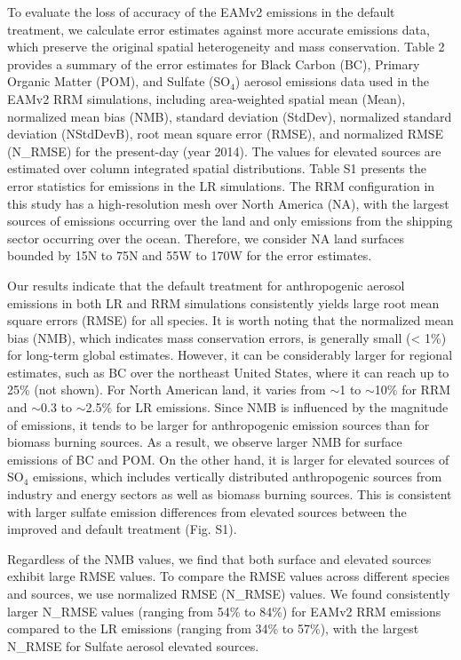 To evaluate the loss of accuracy of the EAMv2 emissions in the default treatment, we calculate error estimates against more accurate emissions data, which preserve the original spatial heterogeneity and mass conservation. Table 2 provides a summary of the error estimates for Black Carbon (BC), Primary Organic Matter (POM), and Sulfate (SO$_4$) aerosol emissions data used in the EAMv2 RRM simulations, including area-weighted spatial mean (Mean), normalized mean bias (NMB), standard deviation (StdDev), normalized standard deviation (NStdDevB), root mean square error (RMSE), and normalized RMSE (N\_RMSE) for the present-day (year 2014). The values for elevated sources are estimated over column integrated spatial distributions. Table S1 presents the error statistics for emissions in the LR simulations. The RRM configuration in this study has a high-resolution mesh over North America (NA), with the largest sources of emissions occurring over the land and only emissions from the shipping sector occurring over the ocean. Therefore, we consider NA land surfaces bounded by 15N to 75N and 55W to 170W for the error estimates.

Our results indicate that the default treatment for anthropogenic aerosol emissions in both LR and RRM simulations consistently yields large root mean square errors (RMSE) for all species. It is worth noting that the normalized mean bias (NMB), which indicates mass conservation errors, is generally small (< 1\%) for long-term global estimates. However, it can be considerably larger for regional estimates, such as BC over the northeast United States, where it can reach up to 25\% (not shown). For North American land, it varies from $\sim$1 to $\sim$10\% for RRM and $\sim$0.3 to $\sim$2.5\% for LR emissions. Since NMB is influenced by the magnitude of emissions, it tends to be larger for anthropogenic emission sources than for biomass burning sources. As a result, we observe larger NMB for surface emissions of BC and POM. On the other hand, it is larger for elevated sources of SO$_4$ emissions, which includes vertically distributed anthropogenic sources from industry and energy sectors as well as biomass burning sources. This is consistent with larger sulfate emission differences from elevated sources between the improved and default treatment (Fig. S1).

Regardless of the NMB values, we find that both surface and elevated sources exhibit large RMSE values. To compare the RMSE values across different species and sources, we use normalized RMSE (N\_RMSE) values. We found consistently larger N\_RMSE values (ranging from 54\% to 84\%) for EAMv2 RRM emissions compared to the LR emissions (ranging from 34\% to 57\%), with the largest N\_RMSE for Sulfate aerosol elevated sources.

